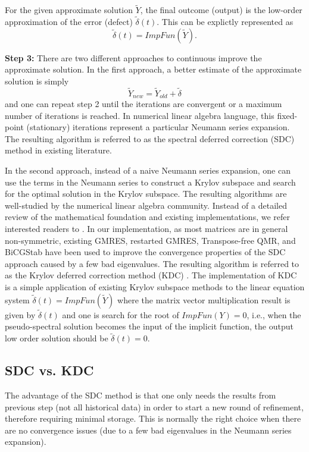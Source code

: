 \documentclass[12pt]{article}
\begin{document}
For the given approximate solution $\tilde{Y}$, the final outcome (output) is the low-order approximation
of the error (defect) $\tilde{\delta}(t)$. This can be explictly represented as
$$\tilde{\delta}(t) = ImpFun(\tilde{Y}).$$

{\noindent \bf Step 3:} There are two different approaches to continuous improve the approximate solution.
In the first approach, a better estimate of the approximate solution is simply 
$$\tilde{Y}_{new} = \tilde{Y}_{old} + \tilde{\delta}$$ 
and one can repeat step 2 until the iterations are convergent or a maximum number of iterations is reached.
In numerical linear algebra language, this fixed-point (stationary) iterations represent a particular 
Neumann series expansion. The resulting algorithm is referred to as the spectral deferred correction (SDC) method 
in existing literature.

In the second approach, instead of a naive Neumann series expansion, one can use the terms in the Neumann series to
construct a Krylov subspace and search for the optimal solution in the Krylov subspace. The resulting algorithms
are well-studied by the numerical linear algebra community. Instead of a detailed review of the mathematical 
foundation and existing implementations, we refer interested readers to \cite{}. In our implementation, 
as most matrices are in general non-symmetric, existing GMRES, restarted GMRES, Transpose-free QMR, and
BiCGStab have been used to improve the convergence properties of the SDC approach caused by a few bad 
eigenvalues. The resulting algorithm is referred to as the Krylov deferred correction method (KDC) \cite{}.
The implementation of KDC is a simple application of existing Krylov subspace methods to the linear equation
system $\tilde{\delta}(t) = ImpFun(\tilde{Y})$ where the matrix vector multiplication result is given by
$\tilde{\delta}(t)$ and one is search for the root of $ImpFun(Y)=0$, i.e., when the pseudo-spectral solution
becomes the input of the implicit function, the output low order solution should be $\tilde{\delta}(t) =0$.

\subsection{SDC vs. KDC}
The advantage of the SDC method is that one only needs the results from previous step (not all historical
data) in order to start a new round of refinement, therefore requiring minimal storage. This is normally
the right choice when there are no convergence issues (due to a few bad eigenvalues in the Neumann series
expansion). 
\end{document}
